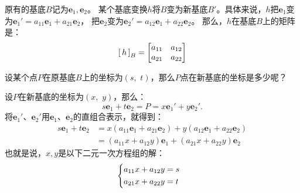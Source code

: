 \documentclass[12pt,UTF8]{ctexbook}
\begin{document}
原有的基底$B$记为$\mathbf{e}_1, \mathbf{e}_2$。
某个基底变换$h$将$B$变为新基底$B'$。具体来说，$h$把$\mathbf{e}_1$变为$\mathbf{e}_1' = a_{11}\mathbf{e}_1 + a_{21}\mathbf{e}_2$，
把$\mathbf{e}_2$变为$\mathbf{e}_2' = a_{12}\mathbf{e}_1 + a_{22}\mathbf{e}_2$。
那么，$h$在基底$B$上的矩阵是：
$$
\bmat{h}[B] = 
\begin{bmatrix}
    a_{11} & a_{12} \\ a_{21} & a_{22}
\end{bmatrix}
$$

设某个点$P$在原基底$B$上的坐标为$(s,\,\, t)$，那么$P$点在新基底的坐标是多少呢？

设$P$在新基底的坐标为$(x,\,\, y)$，那么：
$$ s\mathbf{e}_1 + t\mathbf{e}_2 = P = x\mathbf{e}_1' + y\mathbf{e}_2'.$$
将$\mathbf{e}_1'$、$\mathbf{e}_2'$用$\mathbf{e}_1$、$\mathbf{e}_2$的直组合表示，就得到：
\begin{align*}
    s\mathbf{e}_1 + t\mathbf{e}_2 &= x(a_{11}\mathbf{e}_1 + a_{21}\mathbf{e}_2) + y(a_{12}\mathbf{e}_1 + a_{22}\mathbf{e}_2)  \\
    &= (a_{11}x + a_{12}y)\mathbf{e}_1 + (a_{21}x + a_{22}y)\mathbf{e}_2 
\end{align*}
也就是说，$x, y$是以下二元一次方程组的解：
\begin{alignat*}{1}
    &   \begin{dcases}
            a_{11}x + a_{12}y = s \\
            a_{21}x + a_{22}y = t
        \end{dcases}
\end{alignat*}
\end{document}
